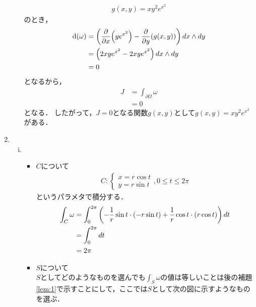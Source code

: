 \begin{enumerate}[(1)]
\begin{enumerate}[(i)]
        \begin{align}
            g(x,y)=xy^2e^{x^2}
        \end{align}
        のとき，
        \begin{align}
            \exd(\omega)
            &=\qty(\pdv{x} (ye^{x^2})-\pdv{y}(g(x,y)) )\dd{x}\wedge\dd{y}\\
            &=\qty(2xye^{x^2}-2xye^{x^2} )\dd{x}\wedge\dd{y}\\
            &=0
        \end{align}
        となるから，
        \begin{align}
            J
            &=\int_{\partial \Omega}\omega\\
            &=0
        \end{align}
        となる．
        したがって，$J=0$となる関数$g(x,y)$として$g(x,y)=xy^2e^{x^2}$がある．
    \end{enumerate}
    \item 
    \begin{enumerate}[(i)]
        \item \begin{itemize}
            \item $C$について
            \begin{align}
                C:\begin{cases}
                    x=r\cos t\\
                    y=r\sin t
                \end{cases}
                ,0\le t \le 2\pi
            \end{align}
            というパラメタで積分する．
            \begin{align}
                \int_C\omega
                &=\int_0^{2\pi} \qty(-\frac{1}{r}\sin t\cdot(-r\sin t)+\frac{1}{r}\cos t\cdot (r\cos t))\dd{t}\\
                &=\int_0^{2\pi} \dd{t}\\
                &=2\pi
            \end{align}
            \item $S$について\\
            $S$としてどのようなものを選んでも$\displaystyle\int_S \omega$の値は等しいことは後の補題\ref{lem:1}で示すことにして，ここでは$S$として次の図に示すようなものを選ぶ．
            \begin{figure}[H]
                \centering
                \begin{tikzpicture}[domain=1:1, yscale=1, xscale=1]
                    

\end{tikzpicture}
\end{figure}
\end{itemize}
\end{enumerate}
\end{enumerate}
